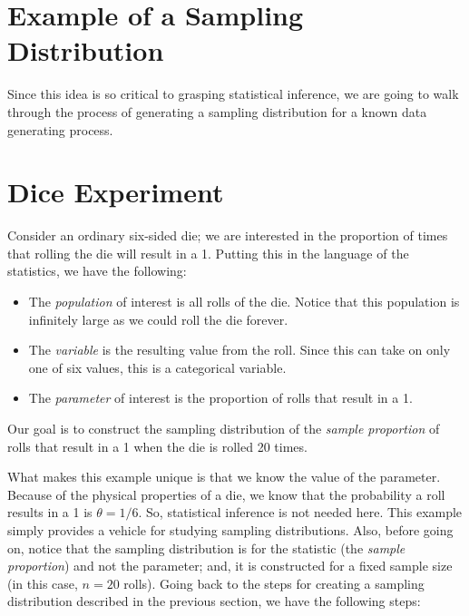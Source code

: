 \documentclass[
  letterpaper,
  DIV=11,
  numbers=noendperiod]{scrreprt}
\providecommand{\tightlist}{%
  \setlength{\itemsep}{0pt}\setlength{\parskip}{0pt}}\usepackage{longtable,booktabs,array}
\theoremstyle{plain}
\theoremstyle{definition}
\theoremstyle{definition}
\theoremstyle{remark}
\begin{document}
\hypertarget{example-of-a-sampling-distribution}{%
\section{Example of a Sampling
Distribution}\label{example-of-a-sampling-distribution}}

Since this idea is so critical to grasping statistical inference, we are
going to walk through the process of generating a sampling distribution
for a known data generating process.

\hypertarget{ex-samplingdistns-dice}{}
\hypertarget{dice-experiment}{%
\section{Dice Experiment}\label{dice-experiment}}

Consider an ordinary six-sided die; we are interested in the proportion
of times that rolling the die will result in a 1. Putting this in the
language of the statistics, we have the following:

\begin{itemize}
\tightlist
\item
  The \emph{population} of interest is all rolls of the die. Notice that
  this population is infinitely large as we could roll the die forever.
\item
  The \emph{variable} is the resulting value from the roll. Since this
  can take on only one of six values, this is a categorical variable.
\item
  The \emph{parameter} of interest is the proportion of rolls that
  result in a 1.
\end{itemize}

Our goal is to construct the sampling distribution of the \emph{sample
proportion} of rolls that result in a 1 when the die is rolled 20 times.

What makes this example unique is that we know the value of the
parameter. Because of the physical properties of a die, we know that the
probability a roll results in a 1 is \(\theta = 1/6\). So, statistical
inference is not needed here. This example simply provides a vehicle for
studying sampling distributions. Also, before going on, notice that the
sampling distribution is for the statistic (the \emph{sample
proportion}) and not the parameter; and, it is constructed for a fixed
sample size (in this case, \(n = 20\) rolls). Going back to the steps
for creating a sampling distribution described in the previous section,
we have the following steps:
\end{document}
